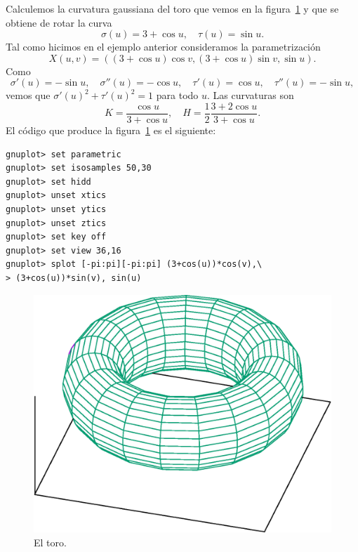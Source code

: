 \begin{example}
	Calculemos la curvatura gaussiana del toro que vemos en la
	figura~\ref{fig:toro} y que se obtiene de rotar la curva
	\[
		\sigma(u)=3+\cos u ,\quad
		\tau(u)=\sin u .
	\]
	Tal como hicimos en el ejemplo anterior consideramos la 
	parametrización
	\[
		X(u,v)=( (3+\cos u)\cos v,(3+\cos u)\sin v,\sin u).
	\]
	Como 
	\[
		\sigma'(u)=-\sin u,\quad
		\sigma''(u)=-\cos u,\quad
		\tau'(u)=\cos u,\quad
		\tau''(u)=-\sin u,
	\]
	vemos que $\sigma'(u)^2+\tau'(u)^2=1$ para todo $u$. 
	Las curvaturas son
	\[
		K = \frac{\cos u}{3+\cos u},
		\quad
		H = \frac{1}{2}\frac{3+2\cos u}{3+\cos u}.
	\]
	El código que produce la figura~\ref{fig:toro} es el siguiente:
\begin{lstlisting}
gnuplot> set parametric
gnuplot> set isosamples 50,30
gnuplot> set hidd
gnuplot> unset xtics
gnuplot> unset ytics
gnuplot> unset ztics
gnuplot> set key off
gnuplot> set view 36,16
gnuplot> splot [-pi:pi][-pi:pi] (3+cos(u))*cos(v),\
> (3+cos(u))*sin(v), sin(u)
\end{lstlisting}
\begin{figure}
		\centering
    	\includegraphics[scale=0.3]{eps/toro}
		\caption{El toro.}
		\label{fig:toro}
\end{figure}
\end{example}

